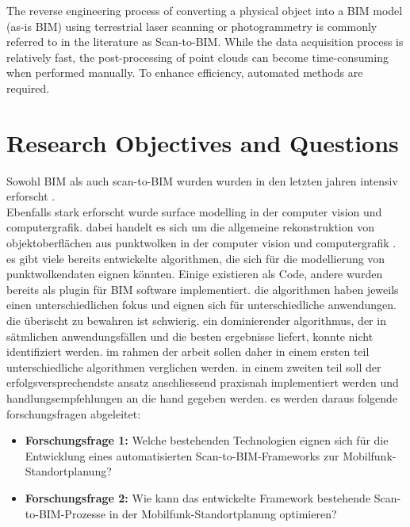 \begin{English}
    The reverse engineering process of converting a physical object into a BIM model (as-is BIM) using terrestrial laser scanning or photogrammetry is commonly referred to in the literature as Scan-to-BIM. While the data acquisition process is relatively fast, the post-processing of point clouds can become time-consuming when performed manually. To enhance efficiency, automated methods are required.
\end{English}

\section{Research Objectives and Questions}
\begin{German}
    Sowohl BIM als auch scan-to-BIM wurden wurden in den letzten jahren intensiv erforscht \cite{rochaSurveyScantoBIMPractices2021}. \\
    Ebenfalls stark erforscht wurde surface modelling in der computer vision und computergrafik. dabei handelt es sich um die allgemeine rekonstruktion von objektoberflächen aus punktwolken in der computer vision und computergrafik \cite{nanPolyFitPolygonalSurface2017}. \\
    es gibt viele bereits entwickelte algorithmen, die sich für die modellierung von punktwolkendaten eignen könnten. Einige existieren als Code, andere wurden bereits als plugin für BIM software implementiert. die algorithmen haben jeweils einen unterschiedlichen fokus und eignen sich für unterschiedliche anwendungen. die überischt zu bewahren ist schwierig. ein dominierender algorithmus, der in sätmlichen anwendungsfällen und die besten ergebnisse liefert, konnte nicht identifiziert werden. im rahmen der arbeit sollen daher in einem ersten teil unterschiedliche algorithmen verglichen werden. in einem zweiten teil soll der erfolgsversprechendste ansatz anschliessend praxisnah implementiert werden und handlungsempfehlungen an die hand gegeben werden. es werden daraus folgende forschungsfragen abgeleitet:\\

    \begin{itemize}
        \item \textbf{Forschungsfrage 1:} Welche bestehenden Technologien eignen sich für die Entwicklung eines automatisierten Scan-to-BIM-Frameworks zur Mobilfunk-Standortplanung?
        \item \textbf{Forschungsfrage 2:} Wie kann das entwickelte Framework bestehende Scan-to-BIM-Prozesse in der Mobilfunk-Standortplanung optimieren?
    \end{itemize}
\end{German}

